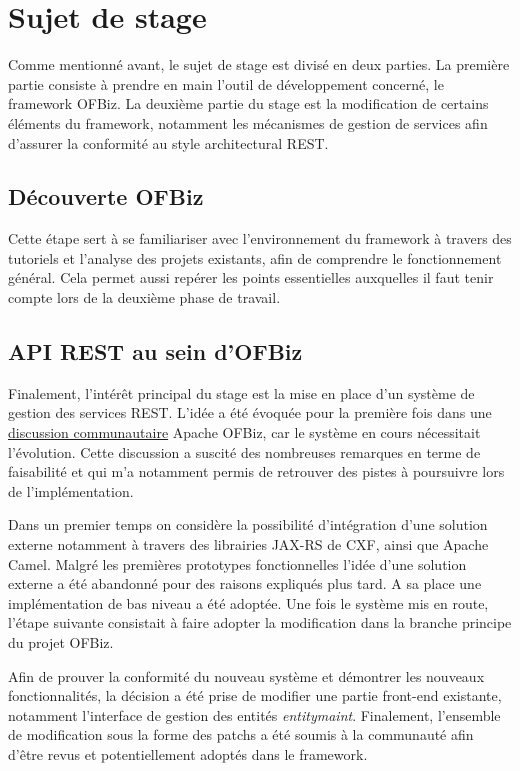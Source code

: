 \newpage
\section{Sujet de stage }
Comme mentionné avant, le sujet de stage est divisé en deux parties. La première partie consiste à prendre en main l'outil de développement concerné, le framework OFBiz. La deuxième partie du stage est la modification de certains éléments du framework, notamment les mécanismes de gestion de services afin d'assurer la conformité au style architectural REST.  

\subsection{Découverte OFBiz}
Cette étape sert à se familiariser avec l'environnement du framework à travers des tutoriels et l'analyse des projets existants, afin de comprendre le fonctionnement général. Cela permet aussi repérer les points essentielles auxquelles il faut tenir compte lors de la deuxième phase de travail. 

\subsection{API REST au sein d'OFBiz}

Finalement, l'intérêt principal du stage est la mise en place d'un système de gestion des services REST. L'idée a été évoquée pour la première fois dans une \href{https://issues.apache.org/jira/browse/OFBIZ-4274}{discussion communautaire} Apache OFBiz, car le système en cours nécessitait l'évolution. Cette discussion a suscité des nombreuses remarques en terme de faisabilité et qui m'a notamment permis de retrouver des pistes à poursuivre lors de l'implémentation.  

Dans un premier temps on considère la possibilité d'intégration d'une solution externe notamment à travers des librairies JAX-RS de CXF, ainsi que Apache Camel. Malgré les premières prototypes fonctionnelles l'idée d'une solution externe a été abandonné pour des raisons expliqués plus tard. A sa place une implémentation de bas niveau a été adoptée. Une fois le système mis en route, l'étape suivante consistait à faire adopter la modification dans la branche principe du projet OFBiz. 

Afin de prouver la conformité du nouveau système et démontrer les nouveaux fonctionnalités, la décision a été prise de modifier une partie front-end existante, notamment l'interface de gestion des entités \emph{entitymaint}. Finalement, l'ensemble de modification sous la forme des patchs a été soumis à la communauté afin d'être revus et potentiellement adoptés dans le framework. 









